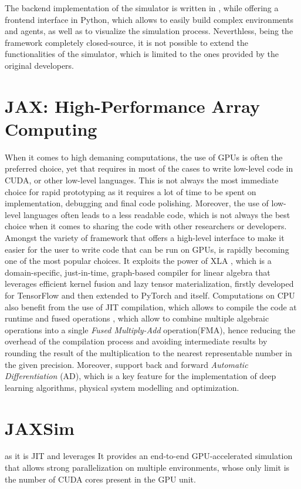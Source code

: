 The backend implementation of the simulator is written in \cpp, while offering a frontend interface in Python, which allows to easily build complex environments and agents, as well as to visualize the simulation process. Neverthless, being the framework completely closed-source, it is not possible to extend the functionalities of the simulator, which is limited to the ones provided by the original developers.

\section{JAX: High-Performance Array Computing}

When it comes to high demaning computations, the use of \ac{GPU}s is often the preferred choice, yet that requires in most of the cases to write low-level code in \ac{CUDA}, \cpp or other low-level languages. This is not always the most immediate choice for rapid prototyping as it requires a lot of time to be spent on implementation, debugging and final code polishing. Moreover, the use of low-level languages often leads to a less readable code, which is not always the best choice when it comes to sharing the code with other researchers or developers. Amongst the variety of framework that offers a high-level interface to make it easier for the user to write code that can be run on \ac{GPU}s, \jax \citep{bradbury_jax_2018,47008} is rapidly becoming one of the most popular choices. It exploits the power of \ac{XLA} \citep{50530}, which is a domain-specific, just-in-time, graph-based compiler for linear algebra that leverages efficient kernel fusion and lazy tensor materialization, firstly developed for TensorFlow \citep{tensorflow2015-whitepaper} and then extended to PyTorch and \jax itself.
Computations on \ac{CPU} also benefit from the use of \ac{JIT} compilation, which allows to compile the code at runtime and fused operations \citep{wang_kernel_2010,snider_operator_2023}, which allow to combine multiple algebraic operations into a single \textit{Fused Multiply-Add} operation(\ac{FMA}), hence reducing the overhead of the compilation process and avoiding intermediate results by rounding the result of the multiplication to the nearest representable number in the given precision.
Moreover, \jax support back and forward \textit{Automatic Differentiation} (\ac{AD}), which is a key feature for the implementation of deep learning algorithms, physical system modelling and optimization.

\section{JAXSim}

\jaxsim \citep{ferigo_jaxsim_2022} as it is \ac{JIT} and leverages \jax
It provides an end-to-end GPU-accelerated simulation that allows strong parallelization on multiple environments, whose only limit is the number of \ac{CUDA} cores present in the GPU unit.
